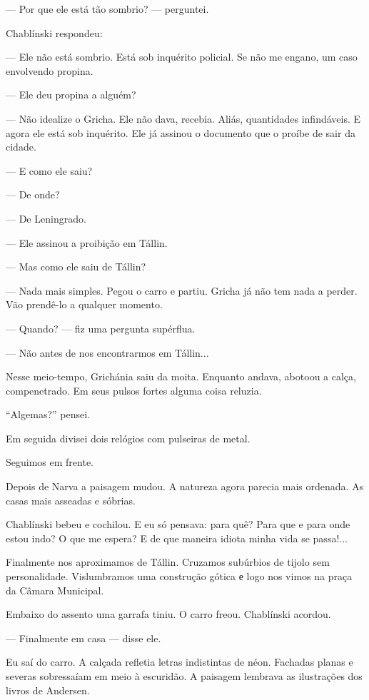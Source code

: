 --- Por que ele está tão sombrio? --- perguntei.

Chablínski respondeu:

--- Ele não está sombrio. Está sob inquérito policial. Se não me engano,
um caso envolvendo propina.

--- Ele deu propina a alguém?

--- Não idealize o Gricha. Ele não dava, recebia. Aliás, quantidades
infindáveis. E agora ele está sob inquérito. Ele já assinou o documento
que o proíbe de sair da cidade.

--- E como ele saiu?

--- De onde?

--- De Leningrado.

--- Ele assinou a proibição em Tállin.

--- Mas como ele saiu de Tállin?

--- Nada mais simples. Pegou o carro e partiu. Gricha já não tem nada a
perder. Vão prendê-lo a qualquer momento.

--- Quando? --- fiz uma pergunta supérflua.

--- Não antes de nos encontrarmos em Tállin...

Nesse meio-tempo, Grichánia saiu da moita. Enquanto andava, abotoou a
calça, compenetrado. Em seus pulsos fortes alguma coisa reluzia.

``Algemas?'' pensei.

Em seguida divisei dois relógios com pulseiras de metal.

Seguimos em frente.

Depois de Narva a paisagem mudou. A natureza agora parecia mais
ordenada. As casas mais asseadas e sóbrias.

Chablínski bebeu e cochilou. E eu só pensava: para quê? Para que e para
onde estou indo? O que me espera? E de que maneira idiota minha vida se
passa!...

Finalmente nos aproximamos de Tállin. Cruzamos subúrbios de tijolo sem
personalidade. Vislumbramos uma construção gótica е logo nos vimos na
praça da Câmara Municipal.

Embaixo do assento uma garrafa tiniu. O carro freou. Chablínski acordou.

--- Finalmente em casa --- disse ele.

Eu saí do carro. A calçada refletia letras indistintas de néon. Fachadas
planas e severas sobressaíam em meio à escuridão. A paisagem lembrava as
ilustrações dos livros de Andersen.


